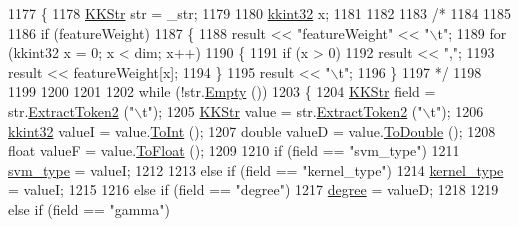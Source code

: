 \begin{DoxyCode}
1177 \{
1178   \hyperlink{class_k_k_b_1_1_k_k_str}{KKStr}  str = \_str;
1179 
1180   \hyperlink{namespace_k_k_b_a8fa4952cc84fda1de4bec1fbdd8d5b1b}{kkint32}  x;
1181 
1182 
1183 \textcolor{comment}{/*}
1184 \textcolor{comment}{  }
1185 \textcolor{comment}{}
1186 \textcolor{comment}{  if  (featureWeight)}
1187 \textcolor{comment}{  \{}
1188 \textcolor{comment}{    result << "featureWeight" << "\(\backslash\)t";}
1189 \textcolor{comment}{    for  (kkint32 x = 0;  x < dim;  x++)}
1190 \textcolor{comment}{    \{}
1191 \textcolor{comment}{      if  (x > 0)}
1192 \textcolor{comment}{        result << ",";}
1193 \textcolor{comment}{      result << featureWeight[x];}
1194 \textcolor{comment}{    \}}
1195 \textcolor{comment}{    result << "\(\backslash\)t";}
1196 \textcolor{comment}{  \}}
1197 \textcolor{comment}{*/}
1198 
1199 
1200 
1201 
1202   \textcolor{keywordflow}{while}  (!str.\hyperlink{class_k_k_b_1_1_k_k_str_ac69942f73fffd672ec2a6e1c410afdb6}{Empty} ())
1203   \{
1204     \hyperlink{class_k_k_b_1_1_k_k_str}{KKStr}   field = str.\hyperlink{class_k_k_b_1_1_k_k_str_afe41140cee0520f0be8a3022938a1b03}{ExtractToken2} (\textcolor{stringliteral}{"\(\backslash\)t"});
1205     \hyperlink{class_k_k_b_1_1_k_k_str}{KKStr}   value = str.\hyperlink{class_k_k_b_1_1_k_k_str_afe41140cee0520f0be8a3022938a1b03}{ExtractToken2} (\textcolor{stringliteral}{"\(\backslash\)t"});
1206     \hyperlink{namespace_k_k_b_a8fa4952cc84fda1de4bec1fbdd8d5b1b}{kkint32} valueI = value.\hyperlink{class_k_k_b_1_1_k_k_str_a4d1582f17461a3fe481fc4a37e8c65c7}{ToInt}    ();
1207     \textcolor{keywordtype}{double}  valueD = value.\hyperlink{class_k_k_b_1_1_k_k_str_a95207190bd6a470ca0ef25ebea459c80}{ToDouble} ();
1208     \textcolor{keywordtype}{float}   valueF = value.\hyperlink{class_k_k_b_1_1_k_k_str_a09b54184fdc585259d265db3deb28e79}{ToFloat}  ();
1209 
1210     \textcolor{keywordflow}{if}  (field == \textcolor{stringliteral}{"svm\_type"})
1211       \hyperlink{struct_s_v_m233_1_1svm__parameter_aa4cc55eaf546e2edb0ff62c5a5f8466e}{svm\_type} = valueI;
1212 
1213     \textcolor{keywordflow}{else} \textcolor{keywordflow}{if}  (field == \textcolor{stringliteral}{"kernel\_type"})
1214       \hyperlink{struct_s_v_m233_1_1svm__parameter_a262be7c9cc8bb14e8bd3476c19eb52dc}{kernel\_type} = valueI;
1215 
1216     \textcolor{keywordflow}{else} \textcolor{keywordflow}{if}  (field == \textcolor{stringliteral}{"degree"})      
1217       \hyperlink{struct_s_v_m233_1_1svm__parameter_abb71ffd3ed9223b5239971d18c59f6fe}{degree} = valueD;
1218 
1219     \textcolor{keywordflow}{else} \textcolor{keywordflow}{if}  (field == \textcolor{stringliteral}{"gamma"})

\end{DoxyCode}

